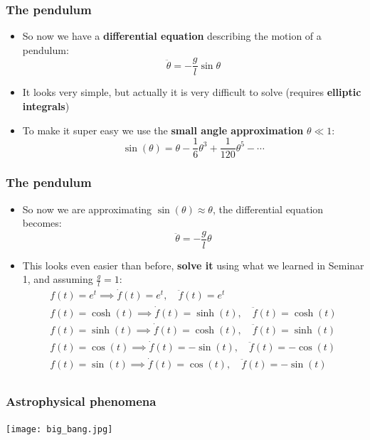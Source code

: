 \documentclass{beamer}
\begin{document}
\begin{frame}
  \frametitle{The pendulum}
  \begin{itemize}
    \item<1-> So now we have a \textbf{differential equation} describing the motion of a pendulum:
      \begin{equation*}
	\ddot{\theta}=-\frac{g}{l}\sin{\theta}
      \end{equation*}
    \item<2-> It looks very simple, but actually it is very difficult to solve (requires \textbf{elliptic integrals})
    \item<3-> To make it super easy we use the \textbf{small angle approximation} $\theta\ll 1$:
      \begin{equation*}
	\sin(\theta)=\theta-\frac{1}{6}\theta^3+\frac{1}{120}\theta^5-\cdots
      \end{equation*}
  \end{itemize}
\end{frame}

\begin{frame}
  \frametitle{The pendulum}
  \begin{itemize}
    \item<1-> So now we are approximating $\sin(\theta)\approx\theta$, the differential equation becomes:
      \begin{equation*}
	\ddot{\theta}=-\frac{g}{l}\theta
      \end{equation*}
    \item<2-> This looks even easier than before, \textbf{solve it} using what we learned in Seminar 1, and assuming $\frac{g}{l}=1$:
      \begin{gather*}
	f(t)=e^t\implies \dot{f}(t)=e^t, \quad \ddot{f}(t)=e^t\\
	f(t)=\cosh(t)\implies \dot{f}(t)=\sinh(t), \quad \ddot{f}(t)=\cosh(t)\\
	f(t)=\sinh(t)\implies \dot{f}(t)=\cosh(t), \quad \ddot{f}(t)=\sinh(t)\\
	f(t)=\cos(t)\implies \dot{f}(t)=-\sin(t), \quad \ddot{f}(t)=-\cos(t)\\
	f(t)=\sin(t)\implies \dot{f}(t)=\cos(t), \quad \ddot{f}(t)=-\sin(t)\\
      \end{gather*}
  \end{itemize}
\end{frame}


\begin{frame}
  \center
  \frametitle{Astrophysical phenomena}
  \texttt{[image: big\_bang.jpg]}
\end{frame}
\end{document}
